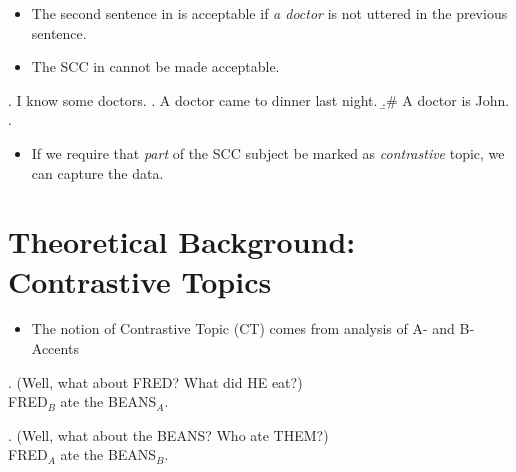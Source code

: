 \documentclass[letterpaper]{article}
\begin{document}
\begin{itemize}
  \item The second sentence in \Last is acceptable if \textit{a doctor} is not uttered in the previous sentence.
  \item The SCC in \LLast cannot be made acceptable.
\end{itemize}
\ex. I know some doctors.
\a. A doctor came to dinner last night.
\b.\# A doctor is John.
\z.

\begin{itemize}
  \item If we require that \textit{part} of the SCC subject be marked as \textit{contrastive} topic, we can capture the data.
\end{itemize}
\section{Theoretical Background: Contrastive Topics}
\begin{itemize}
  \item The notion of Contrastive Topic (CT) comes from  analysis of  A- and B-Accents
\end{itemize}
\ex. (Well, what about FRED? What did HE eat?)\\
FRED$_B$ ate the BEANS$_A$.

\ex. (Well, what about the BEANS? Who ate THEM?)\\
FRED$_A$ ate the BEANS$_B$.
\end{document}
